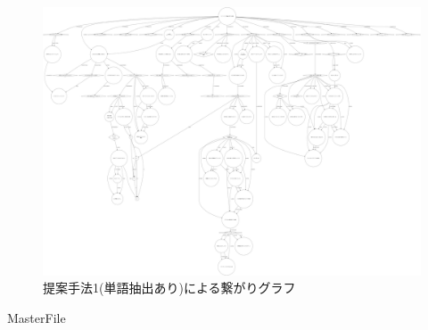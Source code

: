 \begin{figure}
	\centering
	\includegraphics[width=\textwidth]{../images/D.TopicGraph/binary_tree_theme8-APPR_FT-min.png}
	\caption{提案手法1(単語抽出あり)による繋がりグラフ}
	\label{Fig:Graph-FT}
\end{figure}

\clearpage
\expandafter\ifx\csname MasterFile\endcsname\relax

\fi
